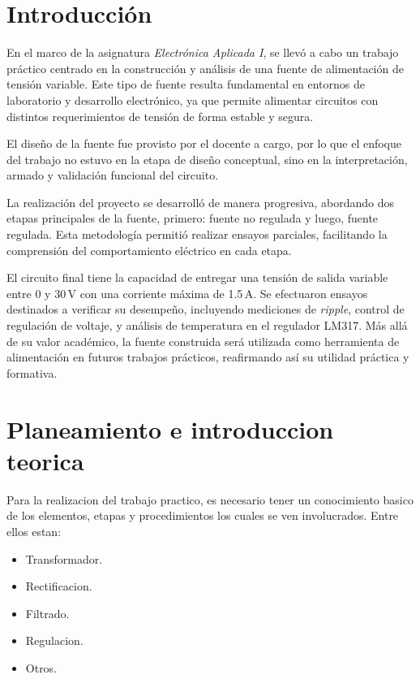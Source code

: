 \documentclass[chaptersright]{informeutn}
\begin{document}
  \maketitle

  \tableofcontents
  \setcounter{page}{1}
  \thispagestyle{plain}

  \chapter{Introducción}

    En el marco de la asignatura \textit{Electrónica Aplicada I}, se llevó a cabo un trabajo práctico centrado en la
    construcción y análisis de una fuente de alimentación de tensión variable. Este tipo de fuente resulta fundamental
    en entornos de laboratorio y desarrollo electrónico, ya que permite alimentar circuitos con distintos
    requerimientos de tensión de forma estable y segura.

    El diseño de la fuente fue provisto por el docente a cargo, por lo que el enfoque del trabajo no estuvo en la etapa
    de diseño conceptual, sino en la interpretación, armado y validación funcional del circuito.

    La realización del proyecto se desarrolló de manera progresiva, abordando dos etapas principales de la
    fuente, primero: fuente no regulada y luego, fuente regulada. Esta metodología permitió realizar ensayos parciales,
    facilitando la comprensión del comportamiento eléctrico en cada etapa.

    El circuito final tiene la capacidad de entregar una tensión de salida variable entre 0 y 30\,V con una corriente
    máxima de 1.5\,A. Se efectuaron ensayos destinados a verificar su desempeño, incluyendo mediciones de
    \textit{ripple}, control de regulación de voltaje, y análisis de temperatura en el regulador LM317. Más allá de su
    valor académico, la fuente construida será utilizada como herramienta de alimentación en futuros trabajos
    prácticos, reafirmando así su utilidad práctica y formativa.

  \chapter{Planeamiento e introduccion teorica}
    Para la realizacion del trabajo practico, es necesario tener un conocimiento basico de los elementos, etapas y
    procedimientos los cuales se ven involucrados. Entre ellos estan:
    \begin{itemize}
      \item Transformador.
      \item Rectificacion.
      \item Filtrado.
      \item Regulacion.
      \item Otros.
    \end{itemize}
\end{document}
